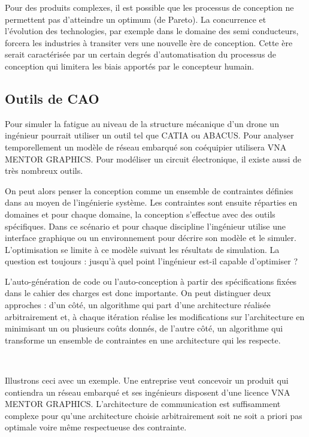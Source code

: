 \documentclass[11pt]{article}
\begin{document}
Pour des produits complexes, il est possible que les processus de conception ne permettent pas d'atteindre un optimum (de Pareto). La concurrence et l'évolution des technologies, par exemple dans le domaine des semi conducteurs, forcera les industries à transiter vers une nouvelle ère de conception. Cette ère serait caractérisée par un certain degrés d'automatisation du processus de conception qui limitera les biais apportés par le concepteur humain.

\subsection{Outils de CAO}

Pour simuler la fatigue au niveau de la structure mécanique d'un drone un ingénieur pourrait utiliser un outil tel que CATIA ou ABACUS. Pour analyser temporellement un modèle de réseau embarqué son coéquipier utilisera VNA MENTOR GRAPHICS. Pour modéliser un circuit électronique, il existe aussi de très nombreux outils.

On peut alors penser la conception comme un ensemble de contraintes définies dans au moyen de l'ingénierie système. Les contraintes sont ensuite réparties en domaines et pour chaque domaine, la conception s'effectue avec des outils spécifiques. Dans ce scénario et pour chaque discipline l'ingénieur utilise une interface graphique ou un environnement pour décrire son modèle et le simuler. L'optimisation se limite à ce modèle suivant les résultats de simulation. La question est toujours : jusqu'à quel point l'ingénieur est-il capable d'optimiser ?

L’auto-génération de code ou l’auto-conception à partir des spécifications fixées dans le cahier des charges est donc importante. On peut distinguer deux approches : d'un côté, un algorithme qui part d’une architecture réalisée arbitrairement et, à chaque itération réalise les modifications sur l’architecture en minimisant un ou plusieurs coûts donnés, de l'autre côté, un algorithme qui transforme un ensemble de contraintes en une architecture qui les respecte.

~

Illustrons ceci avec un exemple. Une entreprise veut concevoir un produit qui contiendra un réseau embarqué et ses ingénieurs disposent d'une licence VNA MENTOR GRAPHICS. L'architecture de communication est suffisamment complexe pour qu'une architecture choisie arbitrairement soit ne soit a priori pas optimale voire même respectueuse des contrainte.
\end{document}
